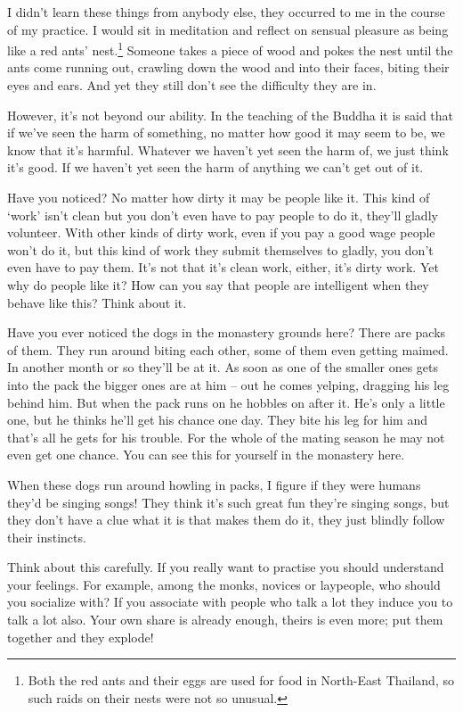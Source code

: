 I didn't learn these things from anybody else, they occurred to me in the course of my practice. I would sit in meditation and reflect on sensual pleasure as being like a red ants' nest.\footnote{Both the red ants and their eggs are used for food in North-East Thailand, so such raids on their nests were not so unusual.} Someone takes a piece of wood and pokes the nest until the ants come running out, crawling down the wood and into their faces, biting their eyes and ears. And yet they still don't see the difficulty they are in.

However, it's not beyond our ability. In the teaching of the Buddha it is said that if we've seen the harm of something, no matter how good it may seem to be, we know that it's harmful. Whatever we haven't yet seen the harm of, we just think it's good. If we haven't yet seen the harm of anything we can't get out of it.

Have you noticed? No matter how dirty it may be people like it. This kind of `work' isn't clean but you don't even have to pay people to do it, they'll gladly volunteer. With other kinds of dirty work, even if you pay a good wage people won't do it, but this kind of work they submit themselves to gladly, you don't even have to pay them. It's not that it's clean work, either, it's dirty work. Yet why do people like it? How can you say that people are intelligent when they behave like this? Think about it.

Have you ever noticed the dogs in the monastery grounds here? There are packs of them. They run around biting each other, some of them even getting maimed. In another month or so they'll be at it. As soon as one of the smaller ones gets into the pack the bigger ones are at him -- out he comes yelping, dragging his leg behind him. But when the pack runs on he hobbles on after it. He's only a little one, but he thinks he'll get his chance one day. They bite his leg for him and that's all he gets for his trouble. For the whole of the mating season he may not even get one chance. You can see this for yourself in the monastery here.

When these dogs run around howling in packs, I figure if they were humans they'd be singing songs! They think it's such great fun they're singing songs, but they don't have a clue what it is that makes them do it, they just blindly follow their instincts.

Think about this carefully. If you really want to practise you should understand your feelings. For example, among the monks, novices or laypeople, who should you socialize with? If you associate with people who talk a lot they induce you to talk a lot also. Your own share is already enough, theirs is even more; put them together and they explode!

